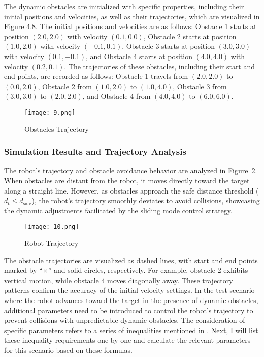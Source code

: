 The dynamic obstacles are initialized with specific properties, including their initial positions and velocities, as well as their trajectories, which are visualized in Figure 4.8. The initial positions and velocities are as follows: Obstacle 1 starts at position \((2.0, 2.0)\) with velocity \((0.1, 0.0)\), Obstacle 2 starts at position \((1.0, 2.0)\) with velocity \((-0.1, 0.1)\), Obstacle 3 starts at position \((3.0, 3.0)\) with velocity \((0.1, -0.1)\), and Obstacle 4 starts at position \((4.0, 4.0)\) with velocity \((0.2, 0.1)\). The trajectories of these obstacles, including their start and end points, are recorded as follows: Obstacle 1 travels from \((2.0, 2.0)\) to \((0.0, 2.0)\), Obstacle 2 from \((1.0, 2.0)\) to \((1.0, 4.0)\), Obstacle 3 from \((3.0, 3.0)\) to \((2.0, 2.0)\), and Obstacle 4 from \((4.0, 4.0)\) to \((6.0, 6.0)\).

\begin{figure}[H]
    \centering
    \texttt{[image: 9.png]}
    \caption{Obstacles Trajectory}
    \label{FIG:9}
\end{figure}

\subsubsection{Simulation Results and Trajectory Analysis}

The robot's trajectory and obstacle avoidance behavior are analyzed in Figure~\ref{FIG:10}. When obstacles are distant from the robot, it moves directly toward the target along a straight line. However, as obstacles approach the safe distance threshold ($d_t \leq d_{\text{safe}}$), the robot's trajectory smoothly deviates to avoid collisions, showcasing the dynamic adjustments facilitated by the sliding mode control strategy. 


\begin{figure}[H]
    \centering
    \texttt{[image: 10.png]}
    \caption{Robot Trajectory}
    \label{FIG:10}
\end{figure}

The obstacle trajectories are visualized as dashed lines, with start and end points marked by “$\times$” and solid circles, respectively. For example, obstacle 2 exhibits vertical motion, while obstacle 4 moves diagonally away. These trajectory patterns confirm the accuracy of the initial velocity settings.
In the test scenario where the robot advances toward the target in the presence of dynamic obstacles, additional parameters need to be introduced to control the robot's trajectory to prevent collisions with unpredictable dynamic obstacles. The consideration of specific parameters refers to a series of inequalities mentioned in \cite{Matveev2012}. Next, I will list these inequality requirements one by one and calculate the relevant parameters for this scenario based on these formulas.

